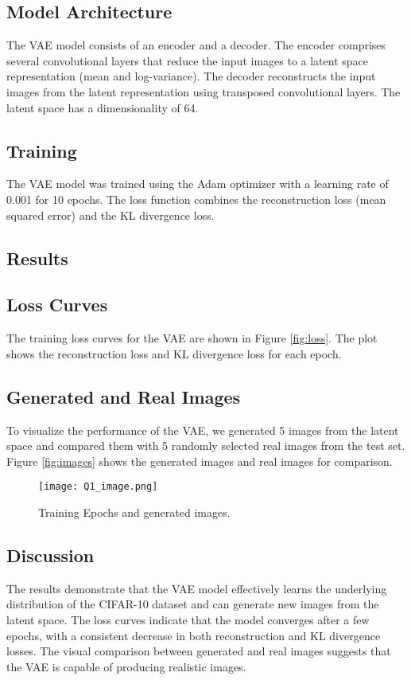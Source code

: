 \documentclass{article}
\begin{document}
\subsection{Model Architecture}
The VAE model consists of an encoder and a decoder. The encoder comprises several convolutional layers that reduce the input images to a latent space representation (mean and log-variance). The decoder reconstructs the input images from the latent representation using transposed convolutional layers. The latent space has a dimensionality of 64.

\subsection{Training}
The VAE model was trained using the Adam optimizer with a learning rate of 0.001 for 10 epochs. The loss function combines the reconstruction loss (mean squared error) and the KL divergence loss. 

\subsection{Results}
\subsection{Loss Curves}
The training loss curves for the VAE are shown in Figure \ref{fig:loss}. The plot shows the reconstruction loss and KL divergence loss for each epoch.



\subsection{Generated and Real Images}
To visualize the performance of the VAE, we generated 5 images from the latent space and compared them with 5 randomly selected real images from the test set. Figure \ref{fig:images} shows the generated images and real images for comparison.


\begin{figure}[h]
    \centering
    \texttt{[image: Q1\_image.png]}
    \caption{Training Epochs and generated images.}
    \label{fig:my_image}
\end{figure}



\subsection{Discussion}
The results demonstrate that the VAE model effectively learns the underlying distribution of the CIFAR-10 dataset and can generate new images from the latent space. The loss curves indicate that the model converges after a few epochs, with a consistent decrease in both reconstruction and KL divergence losses. The visual comparison between generated and real images suggests that the VAE is capable of producing realistic images.
\end{document}
